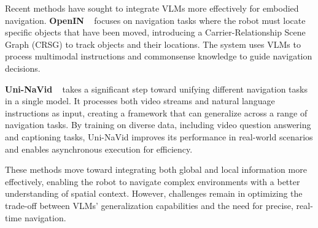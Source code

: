 Recent methods have sought to integrate VLMs more effectively for embodied navigation. \textbf{OpenIN} ~\citep{tang2025openin} focuses on navigation tasks where the robot must locate specific objects that have been moved, introducing a Carrier-Relationship Scene Graph (CRSG) to track objects and their locations. The system uses VLMs to process multimodal instructions and commonsense knowledge to guide navigation decisions.

\textbf{Uni-NaVid} ~\citep{zhang2024uni} takes a significant step toward unifying different navigation tasks in a single model. It processes both video streams and natural language instructions as input, creating a framework that can generalize across a range of navigation tasks. By training on diverse data, including video question answering and captioning tasks, Uni-NaVid improves its performance in real-world scenarios and enables asynchronous execution for efficiency.

These methods move toward integrating both global and local information more effectively, enabling the robot to navigate complex environments with a better understanding of spatial context. However, challenges remain in optimizing the trade-off between VLMs’ generalization capabilities and the need for precise, real-time navigation.